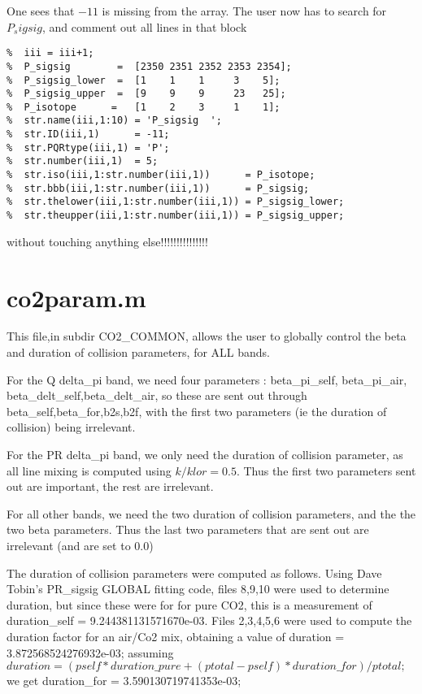 \documentclass[11pt]{article}
\begin{document}
One sees that $-11$ is missing from the array. The user now has to search for
$P_sigsig$, and comment out all lines in that block
\begin{verbatim}
%  iii = iii+1; 
%  P_sigsig        =  [2350 2351 2352 2353 2354]; 
%  P_sigsig_lower  =  [1    1    1     3    5]; 
%  P_sigsig_upper  =  [9    9    9     23   25]; 
%  P_isotope      =   [1    2    3     1    1]; 
%  str.name(iii,1:10) = 'P_sigsig  ';  
%  str.ID(iii,1)      = -11;    
%  str.PQRtype(iii,1) = 'P'; 
%  str.number(iii,1)  = 5; 
%  str.iso(iii,1:str.number(iii,1))      = P_isotope; 
%  str.bbb(iii,1:str.number(iii,1))      = P_sigsig;        
%  str.thelower(iii,1:str.number(iii,1)) = P_sigsig_lower;  
%  str.theupper(iii,1:str.number(iii,1)) = P_sigsig_upper; 
\end{verbatim}
without touching anything else!!!!!!!!!!!!!!!

\section{co2param.m}
This file,in subdir CO2\_COMMON, allows the user to globally control the 
beta and duration of collision parameters, for ALL bands. 

For the Q delta\_pi band, we need four parameters : beta\_pi\_self, 
beta\_pi\_air, beta\_delt\_self,beta\_delt\_air, so these are sent out through 
beta\_self,beta\_for,b2s,b2f, with the first two parameters (ie the 
duration of collision) being irrelevant.

For the PR delta\_pi band, we only need the duration of collision parameter,
as all line mixing is computed using $k/klor = 0.5$. Thus the first two
parameters sent out are important, the rest are irrelevant.

For all other bands, we need the two duration of collision parameters, and the 
the two beta parameters. Thus the last two parameters that are sent out are 
irrelevant (and are set to 0.0)

The duration of collision parameters were computed as follows. Using Dave 
Tobin's PR\_sigsig GLOBAL fitting code, files 8,9,10 were used to determine
duration, but since these were for for pure CO2, this is a measurement of
duration\_self = 9.244381131571670e-03. Files 2,3,4,5,6 were used to compute 
the duration factor for an air/Co2 mix, obtaining a value of 
duration = 3.872568524276932e-03; assuming \\
\begin{math}
duration=(pself*duration\_pure+(ptotal-pself)*duration\_for)/ptotal;  
\end{math}
we get duration\_for = 3.590130719741353e-03;
\end{document}
